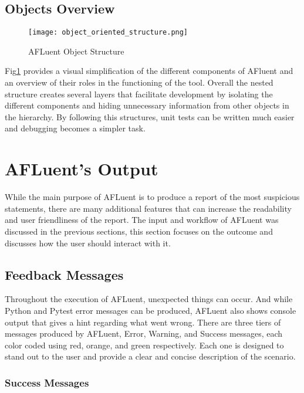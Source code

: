 \subsection{Objects Overview}
\label{subsec:obj_overview}

\begin{figure}[!htb]
	\begin{center}
		\texttt{[image: object\_oriented\_structure.png]}
		\caption{\label{fig:oop_structure} AFLuent Object Structure}
	\end{center}
\end{figure}

Fig\ref{fig:oop_structure} provides a visual simplification of the different
components of AFluent and an overview of their roles in the functioning of the
tool. Overall the nested structure creates several layers that facilitate
development by isolating the different components and hiding unnecessary
information from other objects in the hierarchy. By following this structures,
unit tests can be written much easier and debugging becomes a simpler task.

\section{AFLuent's Output}
\label{sec:afluent_output}

While the main purpose of AFLuent is to produce a report of the most suspicious
statements, there are many additional features that can increase the readability
and user friendliness of the report. The input and workflow of AFLuent was
discussed in the previous sections, this section focuses on the outcome and
discusses how the user should interact with it.

\subsection{Feedback Messages}
\label{subsec:feedback_messages}

Throughout the execution of AFLuent, unexpected things can occur. And while
Python and Pytest error messages can be produced, AFLuent also shows console
output that gives a hint regarding what went wrong. There are three tiers of
messages produced by AFLuent, Error, Warning, and Success messages, each color
coded using red, orange, and green respectively. Each one is designed to stand
out to the user and provide a clear and concise description of the scenario.

\subsubsection{Success Messages}
\label{subsubsec:success_message}

